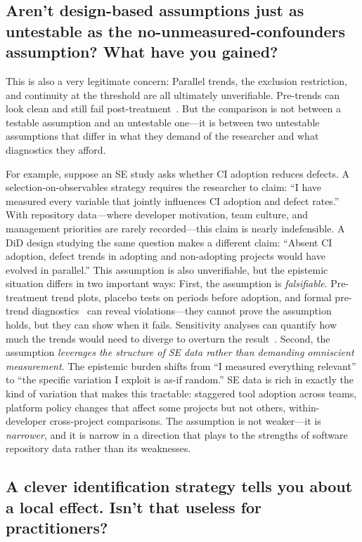\subsection{Aren't design-based assumptions just as untestable as the no-unmeasured-confounders assumption? What have you gained?}

This is also a very legitimate concern: Parallel trends, the exclusion restriction, and continuity at the threshold are all ultimately unverifiable.
Pre-trends can look clean and still fail post-treatment~\cite{roth2023whats}.
But the comparison is not between a testable assumption and an untestable one---it is between two untestable assumptions that differ in what they demand of the researcher and what diagnostics they afford.

For example, suppose an SE study asks whether CI adoption reduces defects.
A selection-on-observables strategy requires the researcher to claim: ``I have measured every variable that jointly influences CI adoption and defect rates.''
With repository data---where developer motivation, team culture, and management priorities are rarely recorded---this claim is nearly indefensible.
A DiD design studying the same question makes a different claim: ``Absent CI adoption, defect trends in adopting and non-adopting projects would have evolved in parallel.''
This assumption is also unverifiable, but the epistemic situation differs in two important ways: First, the assumption is \emph{falsifiable}.
Pre-treatment trend plots, placebo tests on periods before adoption, and formal pre-trend diagnostics~\cite{roth2023whats} can reveal violations---they cannot prove the assumption holds, but they can show when it fails.
Sensitivity analyses can quantify how much the trends would need to diverge to overturn the result~\cite{cinelli2020making, rosenbaum2002observational}.
Second, the assumption \emph{leverages the structure of SE data rather than demanding omniscient measurement}.
The epistemic burden shifts from ``I measured everything relevant'' to ``the specific variation I exploit is as-if random.''
SE data is rich in exactly the kind of variation that makes this tractable: staggered tool adoption across teams, platform policy changes that affect some projects but not others, within-developer cross-project comparisons.
The assumption is not weaker---it is \emph{narrower}, and it is narrow in a direction that plays to the strengths of software repository data rather than its weaknesses.

\subsection{A clever identification strategy tells you about a local effect. Isn't that useless for practitioners?}

